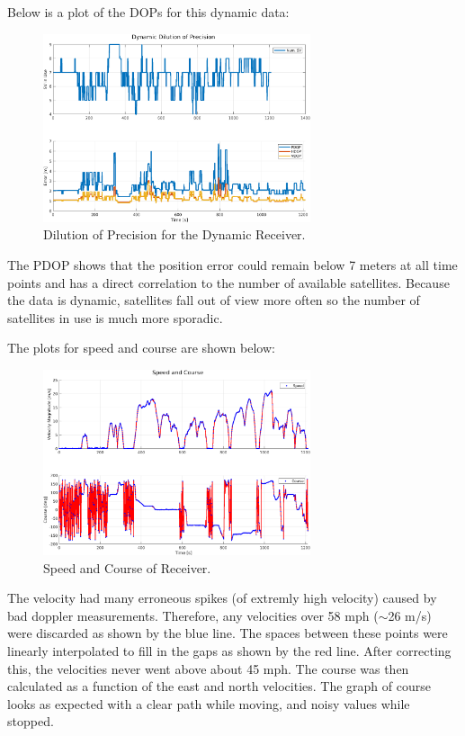 \documentclass[11pt]{article}
\begin{document}
\begin{enumerate}[label=\textbf{\arabic*.}]
  Below is a plot of the DOPs for this dynamic data:
  \begin{figure}[H]
    \centering
    \includegraphics[width=0.7\textwidth]{dynamic_dop.png}
    \caption{Dilution of Precision for the Dynamic Receiver.}
  \end{figure}
  The PDOP shows that the position error could remain below 7 meters at all 
  time points and has a direct correlation to the number of available satellites. 
  Because the data is dynamic, satellites fall out of view more often so the number 
  of satellites in use is much more sporadic.

  The plots for speed and course are shown below:
  \begin{figure}[H]
    \centering
    \includegraphics[width=0.7\textwidth]{dynamic_vel_course.png}
    \caption{Speed and Course of Receiver.}
  \end{figure}
  The velocity had many erroneous spikes (of extremly high velocity) caused by bad 
  doppler measurements. Therefore, any velocities over 58 mph ($\sim$26 m/s) were discarded 
  as shown by the blue line. The spaces between these points were linearly interpolated 
  to fill in the gaps as shown by the red line. After correcting this, the velocities 
  never went above about 45 mph. The course was then calculated as a function of the east and 
  north velocities. The graph of course looks as expected with a clear path while moving, 
  and noisy values while stopped. \\


\end{enumerate}
\end{document}
